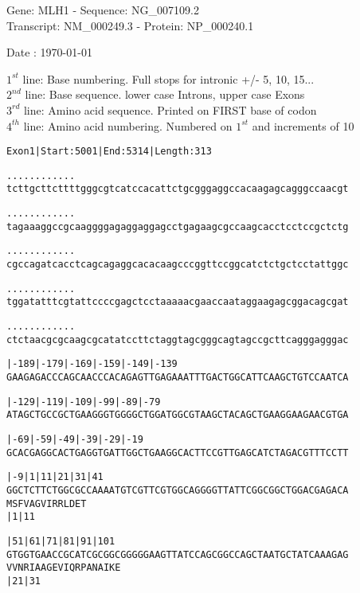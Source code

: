 \documentclass{article}
\begin{document}
\begin{center}
\begin{large}
Gene: MLH1 - Sequence: NG\_007109.2\\
Transcript: NM\_000249.3 - Protein: NP\_000240.1
 
Date : \today
{}
\end{large}
\end{center}
$1^{st}$ line: Base numbering. Full stops for intronic +/- 5, 10, 15...\\
$2^{nd}$ line: Base sequence. lower case Introns, upper case Exons\\
$3^{rd}$ line: Amino acid sequence. Printed on FIRST base of codon\\
$4^{th}$ line: Amino acid numbering. Numbered on $1^{st}$ and increments of 10\\
\begin{alltt}
Exon 1 | Start: 5001 | End: 5314 | Length: 313

.    .    .    .    .    .    .    .    .    .    .    .    
tcttgcttcttttgggcgtcatccacattctgcgggaggccacaagagcagggccaacgt

.    .    .    .    .    .    .    .    .    .    .    .    
tagaaaggccgcaaggggagaggaggagcctgagaagcgccaagcacctcctccgctctg

.    .    .    .    .    .    .    .    .    .    .    .    
cgccagatcacctcagcagaggcacacaagcccggttccggcatctctgctcctattggc

.    .    .    .    .    .    .    .    .    .    .    .    
tggatatttcgtattccccgagctcctaaaaacgaaccaataggaagagcggacagcgat

.    .    .    .    .    .    .    .    .    .    .    .    
ctctaacgcgcaagcgcatatccttctaggtagcgggcagtagccgcttcagggagggac

         |-189     |-179     |-169     |-159     |-149     |-139
GAAGAGACCCAGCAACCCACAGAGTTGAGAAATTTGACTGGCATTCAAGCTGTCCAATCA

         |-129     |-119     |-109     |-99      |-89      |-79
ATAGCTGCCGCTGAAGGGTGGGGCTGGATGGCGTAAGCTACAGCTGAAGGAAGAACGTGA

         |-69      |-59      |-49      |-39      |-29      |-19
GCACGAGGCACTGAGGTGATTGGCTGAAGGCACTTCCGTTGAGCATCTAGACGTTTCCTT

         |-9      |1        |11       |21       |31       |41
GGCTCTTCTGGCGCCAAAATGTCGTTCGTGGCAGGGGTTATTCGGCGGCTGGACGAGACA
                  M  S  F  V  A  G  V  I  R  R  L  D  E  T  
                  |1                            |11         

        |51       |61       |71       |81       |91       |101
GTGGTGAACCGCATCGCGGCGGGGGAAGTTATCCAGCGGCCAGCTAATGCTATCAAAGAG
V  V  N  R  I  A  A  G  E  V  I  Q  R  P  A  N  A  I  K  E  
                  |21                           |31         

\end{alltt}
\end{document}
